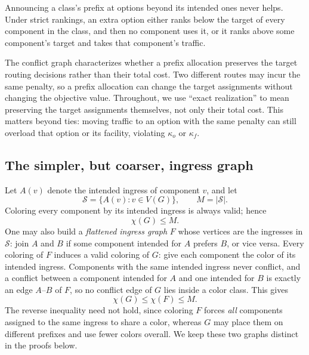 \documentclass[10pt,a4paper]{article}
\newcommand{\Sset}{\mathcal S}
\begin{document}
Announcing a class's prefix at options beyond its intended ones never helps. Under strict rankings, an extra option either ranks below the target of every component in the class, and then no component uses it, or it ranks above some component's target and takes that component's traffic.

The conflict graph characterizes whether a prefix allocation preserves the target routing decisions rather than their total cost. Two different routes may incur the same penalty, so a prefix allocation can change the target assignments without changing the objective value. Throughout, we use ``exact realization'' to mean preserving the target assignments themselves, not only their total cost. This matters beyond ties: moving traffic to an option with the same penalty can still overload that option or its facility, violating $\kappa_o$ or $\kappa_f$.

\subsection{The simpler, but coarser, ingress graph}

Let $A(v)$ denote the intended ingress of component $v$, and let
\[
\Sset=\{A(v):v\in V(G)\},\qquad M=|\Sset|.
\]
Coloring every component by its intended ingress is always valid; hence
\begin{equation}\label{eq:M}
\chi(G)\le M.
\end{equation}
One may also build a \emph{flattened ingress graph} $F$ whose vertices are the ingresses in $\Sset$: join $A$ and $B$ if some component intended for $A$ prefers $B$, or vice versa. Every coloring of $F$ induces a valid coloring of $G$: give each component the color of its intended ingress. Components with the same intended ingress never conflict, and a conflict between a component intended for $A$ and one intended for $B$ is exactly an edge $A$--$B$ of $F$, so no conflict edge of $G$ lies inside a color class. This gives
\begin{equation}\label{eq:flatten}
\chi(G)\le\chi(F)\le M.
\end{equation}
The reverse inequality need not hold, since coloring $F$ forces \emph{all} components assigned to the same ingress to share a color, whereas $G$ may place them on different prefixes and use fewer colors overall. We keep these two graphs distinct in the proofs below.
\end{document}
